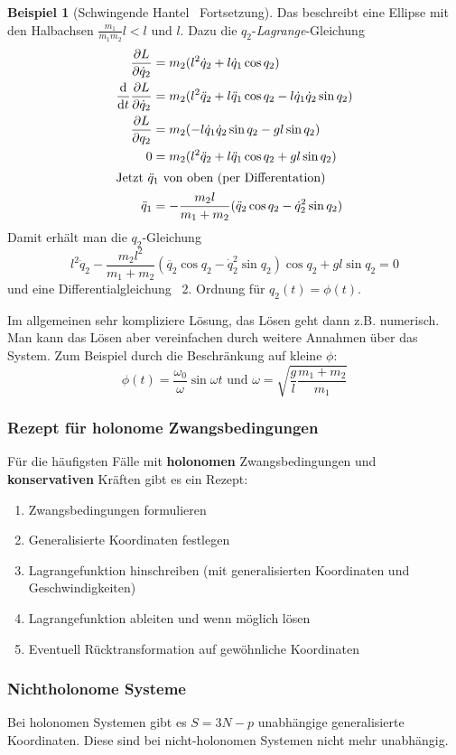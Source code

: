 \documentclass[oneside]{book}
\theoremstyle{definition}
\newtheorem*{beispiel*}{Beispiel}
\newcommand{\Dgl}{Differentialgleichung}
\renewcommand{\d}{\mathrm d}
\newcommand{\dd}[1]{\frac{\d}{\d #1}}
\newcommand{\ffpartial}[2]{\frac{\partial #1}{\partial #2}}
\begin{document}
\begin{beispiel*}[Schwingende Hantel \textendash~Fortsetzung]
	Das beschreibt eine Ellipse mit den Halbachsen $\frac{m_1}{m_1 m_2}l < l \text{~und~} l$.
	Dazu die $q_2$-\textit{Lagrange}-Gleichung
	\begin{align*}
	\ffpartial{L}{\dot{q}_2} &= m_2 (l^2 \dot{q}_2 + l \dot{q}_1 \cos q_2)\\
	\dd t \ffpartial{L}{\dot{q}_2} &= m_2 (l^2 \ddot{q}_2 + l \ddot{q}_1 \cos q_2 - l \dot{q}_1 \dot{q}_2 \sin q_2)\\
	\ffpartial{L}{q_2} &= m_2 (- l \dot{q}_1 \dot{q}_2 \sin q_2 - g l \sin q_2)\\
	0 &= m_2 (l^2 \ddot{q}_2 + l \ddot{q}_1 \cos q_2 + g l \sin q_2)\\
	\intertext{Jetzt $\ddot{q}_1$ von oben (per Differentation)}
	\ddot{q}_1 &= - \frac{m_2 l}{m_1 + m_2} (\ddot{q}_2 \cos q_2 - \dot{q}_2^2 \sin q_2)
	\end{align*}
	Damit erhält man die $q_2$-Gleichung
	$$l^2 \ddot{q}_2 - \frac{m_2 l^2}{m_1 + m_2}(\ddot{q_2} \cos q_2 - \dot{q}_2^2 \sin q_2) \cos q_2 + g l \sin q_2 = 0$$
	und eine \Dgl~ 2. Ordnung für $q_2(t) = \phi(t)$.
	
	Im allgemeinen sehr kompliziere Lösung, das Lösen geht dann z.B. numerisch. Man kann das Lösen aber vereinfachen durch weitere Annahmen über das System. Zum Beispiel durch die Beschränkung auf kleine $\phi$:
	$$\phi(t) = \frac{\omega_0}{\omega} \sin \omega t \text{~und~} \omega = \sqrt{\frac{g}{l} \frac{m_1 + m_2}{m_1}}$$
\end{beispiel*}


\subsubsection{Rezept für holonome Zwangsbedingungen}

Für die häufigsten Fälle mit \textbf{holonomen} Zwangsbedingungen und \textbf{konservativen} Kräften gibt es ein Rezept:
\begin{enumerate}
\item Zwangsbedingungen formulieren
\item Generalisierte Koordinaten festlegen
\item Lagrangefunktion hinschreiben (mit generalisierten Koordinaten und Geschwindigkeiten)
\item Lagrangefunktion ableiten und wenn möglich lösen
\item Eventuell Rücktransformation auf gewöhnliche Koordinaten
\end{enumerate}

\subsubsection{Nichtholonome Systeme}
Bei holonomen Systemen gibt es $S = 3N - p$ unabhängige generalisierte Koordinaten. Diese sind bei nicht-holonomen Systemen nicht mehr unabhängig.
\end{document}
